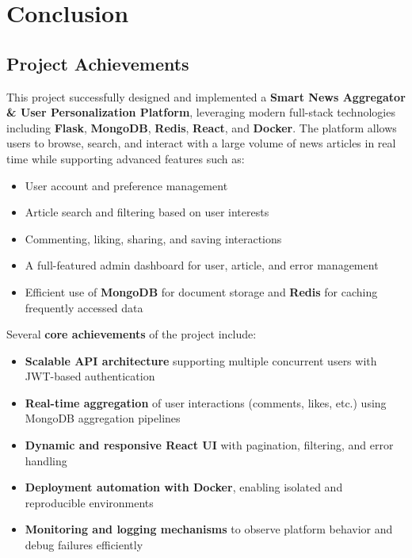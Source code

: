 

\chapter{Conclusion}\label{ch:conclusion}


\section{Project Achievements}\label{sec:project-achievements}


This project successfully designed and implemented a \textbf{Smart News Aggregator \& User Personalization Platform},
leveraging modern full-stack technologies including \textbf{Flask}, \textbf{MongoDB}, \textbf{Redis}, \textbf{React}, and \textbf{Docker}.
The platform allows users to browse, search, and interact with a large volume of news articles in real time while supporting advanced features such as:

\begin{itemize}
    \item User account and preference management
    \item Article search and filtering based on user interests
    \item Commenting, liking, sharing, and saving interactions
    \item A full-featured admin dashboard for user, article, and error management
    \item Efficient use of \textbf{MongoDB} for document storage and \textbf{Redis} for caching frequently accessed data
\end{itemize}



Several \textbf{core achievements} of the project include:

\begin{itemize}
    \item \textbf{Scalable API architecture} supporting multiple concurrent users with JWT-based authentication
    \item \textbf{Real-time aggregation} of user interactions (comments, likes, etc.) using MongoDB aggregation pipelines
    \item \textbf{Dynamic and responsive React UI} with pagination, filtering, and error handling
    \item \textbf{Deployment automation with Docker}, enabling isolated and reproducible environments
    \item \textbf{Monitoring and logging mechanisms} to observe platform behavior and debug failures efficiently
\end{itemize}


